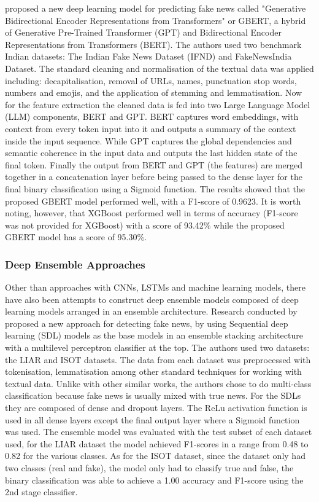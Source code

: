 \documentclass[stu,12pt,floatsintext,donotrepeattitle]{apa7}
\begin{document}
\textcite{gbert} proposed a new deep learning model for predicting fake news called "Generative Bidirectional Encoder Representations from Transformers" or GBERT, a hybrid of Generative Pre-Trained Transformer (GPT) and Bidirectional Encoder Representations from Transformers (BERT). The authors used two benchmark Indian datasets: The Indian Fake News Dataset (IFND) and FakeNewsIndia Dataset. The standard cleaning and normalisation of the textual data was applied including: decapitalisation, removal of URLs, names, punctuation stop words, numbers and emojis, and the application of stemming and lemmatisation. Now for the feature extraction the cleaned data is fed into two Large Language Model (LLM) components, BERT and GPT. BERT captures word embeddings, with context from every token input into it and outputs a summary of the context inside the input sequence. While GPT captures the global dependencies and semantic coherence in the input data and outputs the last hidden state of the final token. Finally the output from BERT and GPT (the features) are merged together in a concatenation layer before being passed to the dense layer for the final binary classification using a Sigmoid function. The results showed that the proposed GBERT model performed well, with a F1-score of 0.9623. It is worth noting, however, that XGBoost performed well in terms of accuracy (F1-score was not provided for XGBoost) with a score of 93.42\% while the proposed GBERT model has a score of 95.30\%.

\subsubsection{Deep Ensemble Approaches}
Other than approaches with CNNs, LSTMs and machine learning models, there have also been attempts to construct deep ensemble models composed of deep learning models arranged in an ensemble architecture. Research conducted by \parencite{deep-ensemble} proposed a new approach for detecting fake news, by using Sequential deep learning (SDL) models as the base models in an ensemble stacking architecture with a multilevel perceptron classifier at the top. The authors used two datasets: the LIAR and ISOT datasets. The data from each dataset was preprocessed with tokenisation, lemmatisation among other standard techniques for working with textual data. Unlike with other similar works, the authors chose to do multi-class classification because fake news is usually mixed with true news. For the SDLs they are composed of dense and dropout layers. The ReLu activation function is used in all dense layers except the final output layer where a Sigmoid function was used. The ensemble model was evaluated with the test subset of each dataset used, for the LIAR dataset the model achieved F1-scores in a range from 0.48 to 0.82 for the various classes. As for the ISOT dataset, since the dataset only had two classes (real and fake), the model only had to classify true and false, the binary classification was able to achieve a 1.00 accuracy and F1-score using the 2nd stage classifier. 
\end{document}
